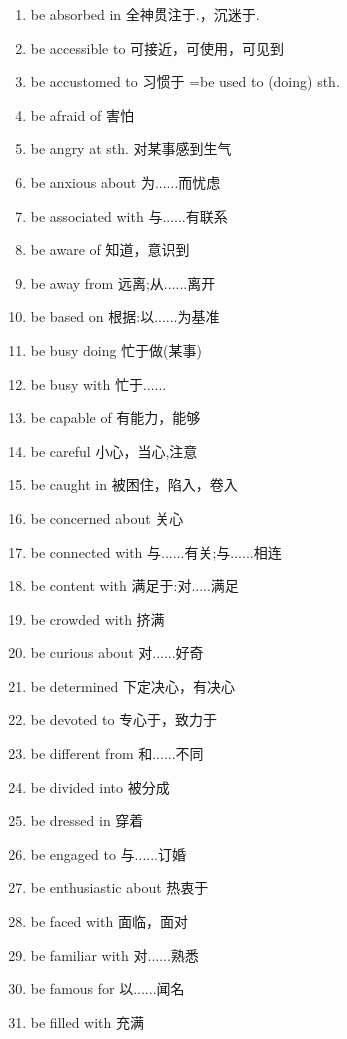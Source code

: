 \documentclass[a4paper,11pt,twocolumn]{ctexart}
\begin{document}
\begin{enumerate}[label=\arabic*., itemsep=0pt, parsep=2pt, topsep=5pt]
    \item be absorbed in 全神贯注于.，沉迷于.
    \item be accessible to 可接近，可使用，可见到
    \item be accustomed to 习惯于 =be used to (doing) sth.
    \item be afraid of 害怕
    \item be angry at sth. 对某事感到生气
    \item be anxious about 为......而忧虑
    \item be associated with 与......有联系
    \item be aware of 知道，意识到
    \item be away from 远离;从......离开
    \item be based on 根据:以......为基准
    \item be busy doing 忙于做(某事)
    \item be busy with 忙于......
    \item be capable of 有能力，能够
    \item be careful 小心，当心,注意
    \item be caught in 被困住，陷入，卷入
    \item be concerned about 关心
    \item be connected with 与......有关;与......相连
    \item be content with 满足于:对.....满足
    \item be crowded with 挤满
    \item be curious about 对......好奇
    \item be determined 下定决心，有决心
    \item be devoted to 专心于，致力于
    \item be different from 和......不同
    \item be divided into 被分成
    \item be dressed in 穿着
    \item be engaged to 与......订婚
    \item be enthusiastic about 热衷于
    \item be faced with 面临，面对
    \item be familiar with 对......熟悉
    \item be famous for 以......闻名
    \item be filled with 充满
\end{enumerate}
\end{document}
